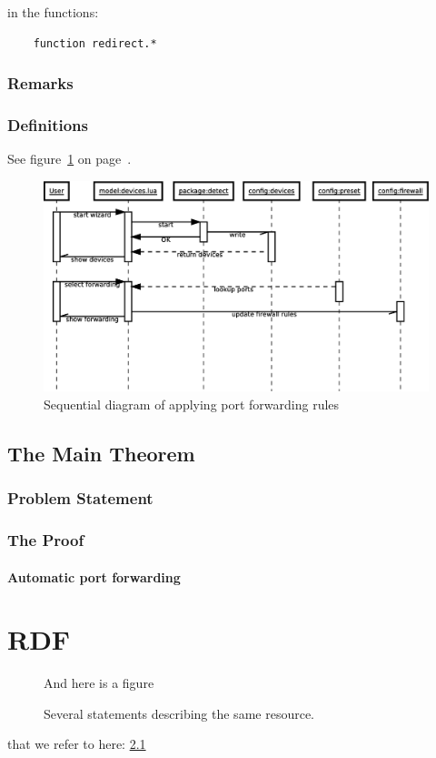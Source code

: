 \documentclass[a4paper,11pt]{kth-mag}
\begin{document}
in the functions:

\begin{verbatim}
    function redirect.*
\end{verbatim}

\subsection{Remarks}

\subsection{Definitions}
See figure~\ref{fig:wizard-seq_dia} on page~\pageref{fig:wizard-seq_dia}.
\begin{figure}[h!]
   \centering
   \includegraphics[width=15cm]{wizard-seq_dia}
   \caption{Sequential diagram of applying port forwarding rules}
   \label{fig:wizard-seq_dia}
\end{figure}

\section{The Main Theorem}

\subsection{Problem Statement}

\subsection{The Proof}
\subsubsection{Automatic port forwarding}


\appendix
\addappheadtotoc
\chapter{RDF}\label{appA}
\begin{figure}[ht]
   \begin{center}
And here is a figure
      \caption{
         \small{
            Several statements describing the same resource.
         }
      }
      \label{RDF_4}
   \end{center}
\end{figure}

that we refer to here: \ref{RDF_4}



\end{document}
